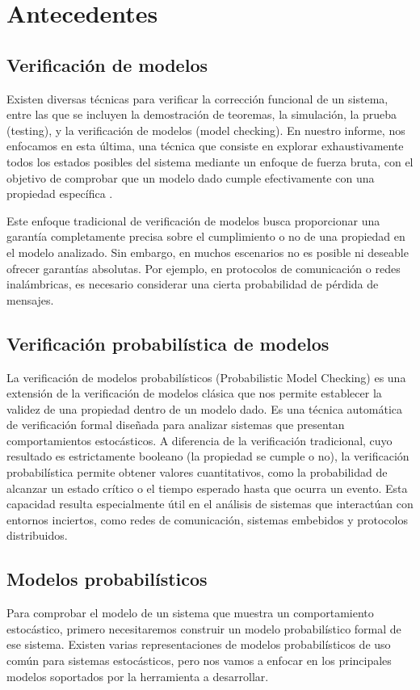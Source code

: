 \documentclass[runningheads]{llncs}
\begin{document}
\section{Antecedentes}

\subsection{Verificación de modelos}

Existen diversas técnicas para verificar la corrección funcional de un sistema, entre las que se incluyen la demostración de teoremas, la simulación, la prueba (testing), y la verificación de modelos (model checking). En nuestro informe, nos enfocamos en esta última, una técnica que consiste en explorar exhaustivamente todos los estados posibles del sistema mediante un enfoque de fuerza bruta, con el objetivo de comprobar que un modelo dado cumple efectivamente con una propiedad específica \cite{BK07}.

Este enfoque tradicional de verificación de modelos busca proporcionar una garantía completamente precisa sobre el cumplimiento o no de una propiedad en el modelo analizado. Sin embargo, en muchos escenarios no es posible ni deseable ofrecer garantías absolutas. Por ejemplo, en protocolos de comunicación o redes inalámbricas, es necesario considerar una cierta probabilidad de pérdida de mensajes.

\subsection{Verificación probabilística de modelos}

La verificación de modelos probabilísticos (Probabilistic Model Checking) es una extensión de la verificación de modelos clásica que nos permite establecer la validez de una propiedad dentro de un modelo dado. Es una técnica automática de verificación formal diseñada para analizar sistemas que presentan comportamientos estocásticos.
A diferencia de la verificación tradicional, cuyo resultado es estrictamente booleano (la propiedad se cumple o no), la verificación probabilística permite obtener valores cuantitativos, como la probabilidad de alcanzar un estado crítico o el tiempo esperado hasta que ocurra un evento. Esta capacidad resulta especialmente útil en el análisis de sistemas que interactúan con entornos inciertos, como redes de comunicación, sistemas embebidos y protocolos distribuidos.

\subsection{Modelos probabilísticos}
Para comprobar el modelo de un sistema que muestra un comportamiento estocástico, primero necesitaremos construir un modelo probabilístico formal de ese sistema. Existen varias representaciones de modelos probabilísticos de uso común para sistemas estocásticos, pero nos vamos a enfocar en los principales modelos soportados por la herramienta a desarrollar.
\end{document}
